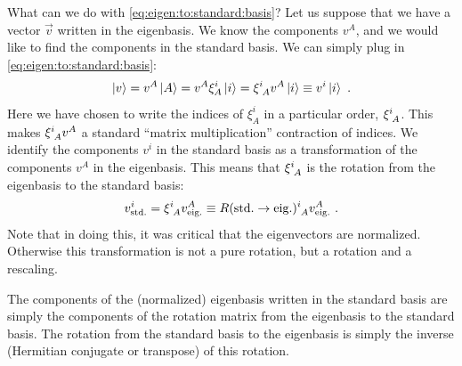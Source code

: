 \documentclass[12pt]{article}
\begin{document}
What can we do with \eqref{eq:eigen:to:standard:basis}? Let us suppose that we have a vector $\vec{v}$ written in the eigenbasis. We know the components $v^A$, and we would like to find the components in the standard basis. We can simply plug in \eqref{eq:eigen:to:standard:basis}:
\begin{align}
    \ket{v} = 
    v^A\ket{A}
    = v^A \xi_A^i \ket{i} =  \xi\aij{i}{A}v^A \ket{i}
    \equiv v^i \ket{i} \ .
    \label{eq:vA:as:vi}
\end{align}
Here we have chosen to write the indices of $\xi^i_A$ in a particular order, $\xi\aij{i}{A}$. This makes $\xi\aij{i}{A}v^A$ a standard ``matrix multiplication'' contraction of indices. We identify the components $v^i$ in the standard basis as a transformation of the components $v^A$ in the eigenbasis. This means that $\xi\aij{i}{A}$ is the rotation from the eigenbasis to the standard basis:
\begin{align}
    v^i_\text{std.} = \xi\aij{i}{A}v^A_\text{eig.} \equiv R(\text{std.}\to\text{eig.})\aij{i}{A}v^A_\text{eig.} \ .
\end{align}
Note that in doing this, it was critical that the eigenvectors are normalized. Otherwise this transformation is not a pure rotation, but a rotation and a rescaling. 

\begin{bigidea}
The components of the (normalized) eigenbasis written in the standard basis are simply the components of the rotation matrix from the eigenbasis to the standard basis. The rotation from the standard basis to the eigenbasis is simply the inverse (Hermitian conjugate or transpose) of this rotation. 
\end{bigidea}
\end{document}

